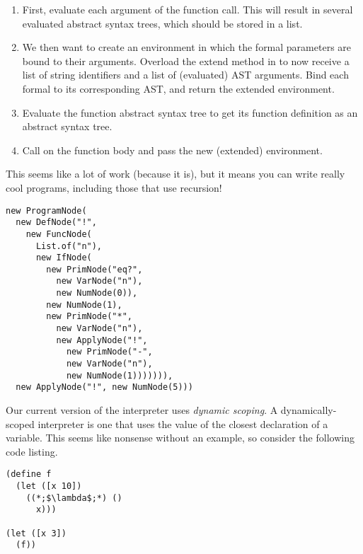 \begin{enumerate}[label=(\alph*)]
  \begin{enumerate}[label=(\roman*)] 
  \item First, evaluate each argument of the function call. This will result in several evaluated abstract syntax trees, which should be stored in a list. 
  \item We then want to create an environment in which the formal parameters are bound to their arguments. Overload the extend method in  to now receive a list of string identifiers and a list of (evaluated) AST arguments. Bind each formal to its corresponding AST, and return the extended environment. 
  \item Evaluate the function abstract syntax tree to get its function definition as an abstract syntax tree.
  \item Call  on the function body and pass the new (extended) environment.
  \end{enumerate}
  This seems like a lot of work (because it is), but it means you can write really cool programs, including those that use recursion!
\begin{small}
\begin{verbatim}
new ProgramNode(
  new DefNode("!", 
    new FuncNode(
      List.of("n"),
      new IfNode(
        new PrimNode("eq?", 
          new VarNode("n"), 
          new NumNode(0)),
        new NumNode(1),
        new PrimNode("*", 
          new VarNode("n"), 
          new ApplyNode("!", 
            new PrimNode("-", 
            new VarNode("n"), 
            new NumNode(1))))))),
  new ApplyNode("!", new NumNode(5)))
\end{verbatim}
\end{small}
\end{enumerate}

Our current version of the interpreter uses \textit{dynamic scoping}. A dynamically-scoped interpreter is one that uses the value of the closest declaration of a variable. This seems like nonsense without an example, so consider the following code listing.
\begin{lstlisting}[language=MyScheme, frame=single]
(define f
  (let ([x 10])
    ((*;$\lambda$;*) ()
      x)))

(let ([x 3])
  (f))
\end{lstlisting}

